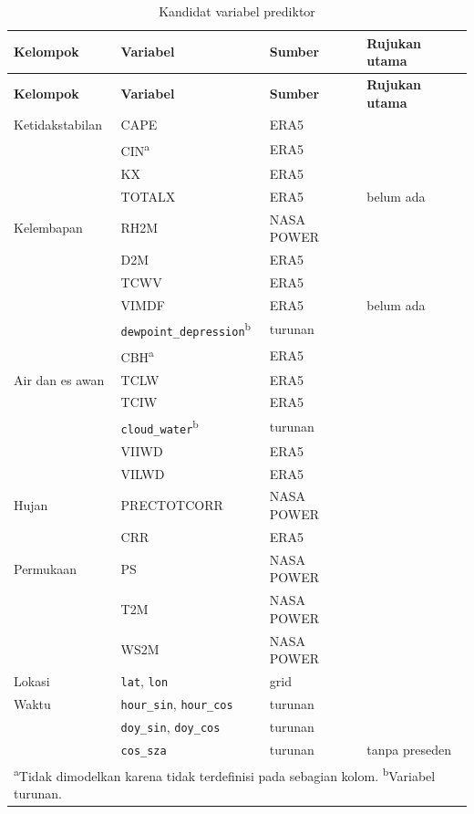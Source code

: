 \begingroup
\footnotesize
\begin{longtable}{| p{2.3cm} | p{3.3cm} | p{1.8cm} | p{4.6cm} |}
\caption{Kandidat variabel prediktor}
\label{tbl:tabelKandidatVariabel} \\
\hline
\textbf{Kelompok} & \textbf{Variabel} & \textbf{Sumber} & \textbf{Rujukan utama} \\
\hline
\endfirsthead
\hline
\textbf{Kelompok} & \textbf{Variabel} & \textbf{Sumber} & \textbf{Rujukan utama} \\
\hline
\endhead
\hline
\endfoot
Ketidakstabilan & CAPE & ERA5 & \cite{cheng2024MLLP, shanTBDMLI} \\
 & CIN\textsuperscript{a} & ERA5 & \cite{sobash2025MLP, ecmwf2026era5doc} \\
 & KX & ERA5 & \cite{fadhil2025} \\
 & TOTALX & ERA5 & belum ada \\
\hline
Kelembapan & RH2M & NASA POWER & \cite{shanTBDMLI, kalashnikov2024PCG} \\
 & D2M & ERA5 & \cite{cheng2024MLLP, sobash2025MLP} \\
 & TCWV & ERA5 & \cite{haywardTBD, kalashnikov2024PCG} \\
 & VIMDF & ERA5 & belum ada \\
 & \texttt{dewpoint\_\allowbreak depression}\textsuperscript{b} & turunan & \cite{shanTBDMLI, sobash2025MLP} \\
 & CBH\textsuperscript{a} & ERA5 & \cite{shanTBDMLI, ecmwf2015cy41r1} \\
\hline
Air dan es awan & TCLW & ERA5 & \cite{cheng2024MLLP, shanTBDMLI} \\
 & TCIW & ERA5 & \cite{cheng2024MLLP, sobash2025MLP} \\
 & \texttt{cloud\_water}\textsuperscript{b} & turunan & \cite{shanTBDMLI} \\
 & VIIWD & ERA5 & \cite{fadhil2025} \\
 & VILWD & ERA5 & \cite{fadhil2025} \\
\hline
Hujan & PRECTOTCORR & NASA POWER & \cite{cheng2024MLLP, shanTBDMLI} \\
 & CRR & ERA5 & \cite{cheng2024MLLP, wang2023} \\
\hline
Permukaan & PS & NASA POWER & \cite{shanTBDMLI, sobash2025MLP} \\
 & T2M & NASA POWER & \cite{cheng2024MLLP, sobash2025MLP} \\
 & WS2M & NASA POWER & \cite{shanTBDMLI} \\
\hline
Lokasi & \texttt{lat}, \texttt{lon} & grid & \cite{sobash2025MLP, fadhil2025} \\
\hline
Waktu & \texttt{hour\_sin}, \texttt{hour\_cos} & turunan & \cite{sobash2025MLP, pacey2026} \\
 & \texttt{doy\_sin}, \texttt{doy\_cos} & turunan & \cite{sobash2025MLP} \\
 & \texttt{cos\_sza} & turunan & tanpa preseden \\
\hline
\multicolumn{4}{l}{\textsuperscript{a}Tidak dimodelkan karena tidak terdefinisi pada sebagian kolom. \textsuperscript{b}Variabel turunan.} \\
\end{longtable}
\endgroup

